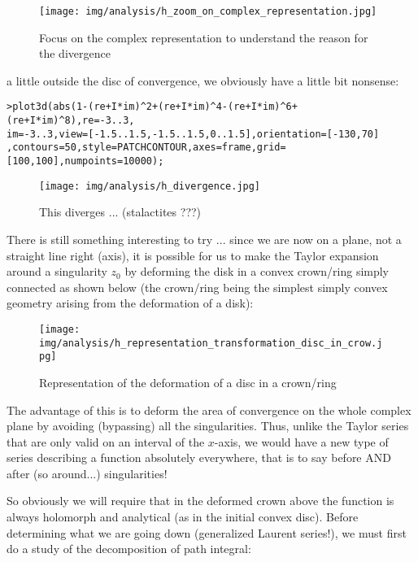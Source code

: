 	\begin{figure}[H]
		\begin{center}
			\texttt{[image: img/analysis/h\_zoom\_on\_complex\_representation.jpg]}
		\end{center}	
		\caption{Focus on the complex representation to understand the reason for the divergence}
	\end{figure}
	a little outside the disc of convergence, we obviously have a little bit nonsense:
	
	\texttt{>plot3d(abs(1-(re+I*im)\string^2+(re+I*im)\string^4-(re+I*im)\string^6+(re+I*im)\string^8),re=-3..3,\\
im=-3..3,view=[-1.5..1.5,-1.5..1.5,0..1.5],orientation=[-130,70]\\
	,contours=50,style=PATCHCONTOUR,axes=frame,grid=[100,100],numpoints=10000);}
	
	\begin{figure}[H]
		\begin{center}
			\texttt{[image: img/analysis/h\_divergence.jpg]}
		\end{center}	
		\caption[]{This diverges ... (stalactites ???)}
	\end{figure}
	There is still something interesting to try ... since we are now on a plane, not a straight line right (axis), it is possible for us to make the Taylor expansion around a singularity $z_0$ by deforming the disk in a convex crown/ring simply connected as shown below (the crown/ring being the simplest simply convex geometry arising from the deformation of a disk):
	\begin{figure}[H]
		\begin{center}
			\texttt{[image: img/analysis/h\_representation\_transformation\_disc\_in\_crow.jpg]}
		\end{center}	
		\caption{Representation of the deformation of a disc in a crown/ring}
	\end{figure}
	The advantage of this is to deform the area of convergence on the whole complex plane by avoiding (bypassing) all the singularities. Thus, unlike the Taylor series that are only valid on an interval of the $x$-axis, we would have a new type of series describing a function absolutely everywhere, that is to say before AND after (so around...) singularities!
	
	So obviously we will require that in the deformed crown above the function is always holomorph and analytical (as in the initial convex disc). Before determining what we are going down (generalized Laurent series!), we must first do a study of the decomposition of path integral:
	
